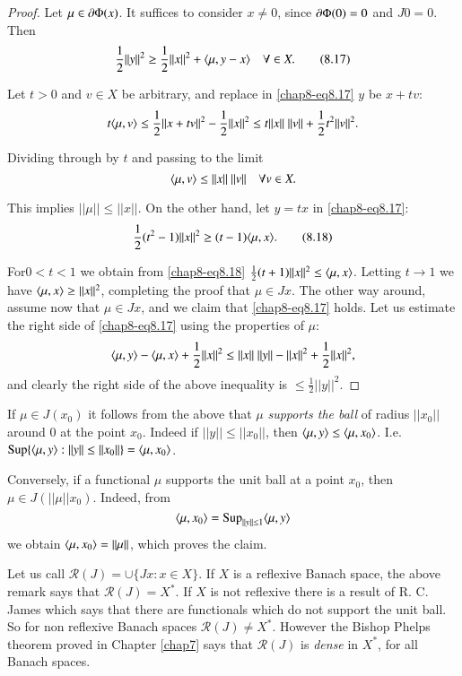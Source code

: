 \begin{proof}
Let $\mu\in \partial \Phi(x)$. It suffices to consider $x\neq 0$, since
$\partial\Phi(0)=0$ and $J0=0$. Then
\begin{equation*}
\frac{1}{2}||y||^{2}\geq \frac{1}{2}||x||^{2}+\langle \mu,y-x\rangle\quad\forall
\in X.\tag{8.17}\label{chap8-eq8.17} 
\end{equation*}

Let $t>0$ and $v\in X$ be arbitrary, and replace in
\eqref{chap8-eq8.17} $y$ be $x+tv$:
$$
t\langle \mu,v\rangle \leq \frac{1}{2}||x+tv||^{2}-\frac{1}{2}||x||^{2}\leq
t||x||~||v||+\frac{1}{2}t^{2}||v||^{2}. 
$$

Dividing through by $t$ and passing to the limit
$$
\langle \mu, v\rangle \leq ||x||~||v||\quad\forall v\in X.
$$

This implies $||\mu||\leq ||x||$. On the other hand, let $y=tx$ in
\eqref{chap8-eq8.17}: 
\begin{equation*}
\frac{1}{2}(t^{2}-1)||x||^{2}\geq (t-1)\langle
\mu,x\rangle.\tag{8.18}\label{chap8-eq8.18} 
\end{equation*}

For\pageoriginale $0<t<1$ we obtain from \eqref{chap8-eq8.18}
$\frac{1}{2}(t+1)||x||^2\leq \langle \mu,x\rangle$. Letting $t\to 1$ we have
$\langle \mu,x\rangle\geq ||x||^{2}$, completing the proof that $\mu\in
Jx$. The other way around, assume now that $\mu\in Jx$, and we claim
that \eqref{chap8-eq8.17} holds. Let us estimate the right side of
\eqref{chap8-eq8.17} using the properties of $\mu$:
$$
\langle \mu,y\rangle -\langle \mu,x\rangle+\frac{1}{2}||x||^{2}\leq
||x||~||y||-||x||^{2}+\frac{1}{2}||x||^{2}, 
$$
and clearly the right side of the above inequality is $\leq
\frac{1}{2}||y||^{2}$. 
\end{proof}

\setcounter{remark}{0}
\begin{remark}\label{chap8-rem1}
If $\mu\in J(x_{0})$ it follows from the above that $\mu$ {\em
  supports the ball} of radius $||x_{0}||$ around $0$ at the point
$x_{0}$. Indeed if $||y||\leq ||x_{0}||$, then $\langle \mu,y\rangle\leq \langle
\mu,x_{0}\rangle$. I.e. $\operatorname{Sup}\{\langle\mu,y\rangle:||y||\leq
||x_{0}||\}=\langle\mu,x_{0}\rangle$. 

Conversely, if a functional $\mu$ supports the unit ball at a point
$x_{0}$, then $\mu\in J(||\mu||x_{0})$. Indeed, from
$$
\langle \mu,x_{0}\rangle=\operatorname{Sup}_{||y||\leq 1}\langle \mu,y\rangle
$$
we obtain $\langle \mu,x_{0}\rangle=||\mu||$, which proves the claim.
\end{remark}

\begin{remark}\label{chap8-rem2}
Let us call $\mathcal{R}(J)=\cup \{Jx:x\in X\}$. If $X$ is a reflexive
Banach space, the above remark says that $\mathcal{R}(J)=X^{*}$. If
$X$ is not reflexive there is a result of R. C. James \cite{key49}
which says that there are functionals which do not support the unit
ball. So for non reflexive Banach spaces $\mathcal{R}(J)\neq
X^{*}$. However the Bishop Phelps theorem proved in Chapter
\ref{chap7} says that $\mathcal{R}(J)$ is {\em dense} in $X^{*}$, for
all Banach spaces.
\end{remark}

